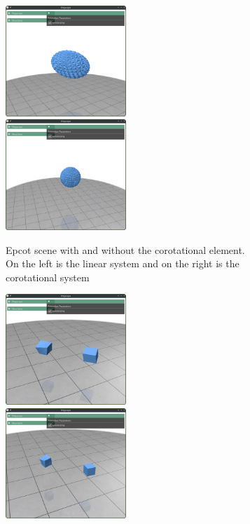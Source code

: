 \documentclass[11pt,a4paper]{article}
\begin{document}
\begin{figure}[t]
  \centering
  \begin{subfigure}[b]{0.6\textwidth}
    \centering
    \includegraphics[width=0.5\textwidth]{figures/epcot-linear.png}%
    \includegraphics[width=0.5\textwidth]{figures/epcot-corot.png}
    \caption{Epcot scene with and without the corotational element. On the left is the linear system and on the right is the corotational system}
    \label{subfig:deform-epcot}
  \end{subfigure}%
  \hfill
  \begin{subfigure}[b]{0.6\textwidth}
    \centering
    \includegraphics[width=0.5\textwidth]{figures/cube86-linear.png}%
    \includegraphics[width=0.5\textwidth]{figures/cube86-corot.png}

\end{subfigure}
\end{figure}
\end{document}
